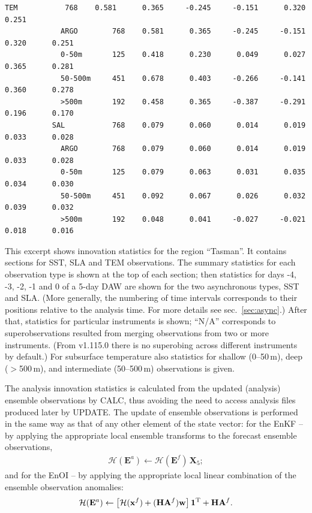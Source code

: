 \documentclass[11pt]{report}
\newcommand{\mb} {\mathbf}
\newcommand{\T}{^{\tiny \mathrm T}}
\begin{document}
\begin{Verbatim}[frame=single,fontsize=\footnotesize]
           TEM           768    0.581      0.365     -0.245     -0.151      0.320      0.251  
             ARGO        768    0.581      0.365     -0.245     -0.151      0.320      0.251  
             0-50m       125    0.418      0.230      0.049      0.027      0.365      0.281  
             50-500m     451    0.678      0.403     -0.266     -0.141      0.360      0.278  
             >500m       192    0.458      0.365     -0.387     -0.291      0.196      0.170  
           SAL           768    0.079      0.060      0.014      0.019      0.033      0.028  
             ARGO        768    0.079      0.060      0.014      0.019      0.033      0.028  
             0-50m       125    0.079      0.063      0.031      0.035      0.034      0.030  
             50-500m     451    0.092      0.067      0.026      0.032      0.039      0.032  
             >500m       192    0.048      0.041     -0.027     -0.021      0.018      0.016  
\end{Verbatim}
This excerpt shows innovation statistics for the region ``Tasman''.
It contains sections for SST, SLA and TEM observations.
The summary statistics for each observation type is shown at the top of each section; then statistics for days -4, -3, -2, -1 and 0 of a 5-day DAW are shown for the two asynchronous types, SST and SLA.
(More generally, the numbering of time intervals corresponds to their positions relative to the analysis time.
For more details see sec.~\ref{sec:async}.)
After that, statistics for particular instruments is shown; ``N/A'' corresponds to superobservations resulted from merging observations from two or more instruments.
(From v1.115.0 there is no superobing across different instruments by default.)
For subsurface temperature also statistics for shallow (0--50\,m), deep ($>$500\,m), and intermediate (50--500\,m) observations is given.

The analysis innovation statistics is calculated from the updated (analysis) ensemble observations by CALC, thus avoiding the need to access analysis files produced later by UPDATE.
The update of ensemble observations is performed in the same way as that of any other element of the state vector:
for the EnKF -- by applying the appropriate local ensemble transforms to the forecast ensemble observations,
\begin{align*}
  \mathcal H (\mb E^a) \leftarrow \mathcal H (\mb E^f) \, \mb X_5;
\end{align*}
and for the EnOI -- by applying the appropriate local linear combination of the ensemble observation anomalies:
\begin{align*}
  \mathcal H (\mb E^a) \leftarrow \left[ \mathcal H (\mb x^f) + (\mb H \mb A^f) \mb w\right] \mb 1\T + \mb H \mb A^f.
\end{align*}
\end{document}
